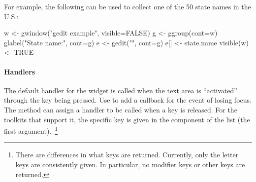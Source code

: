 For example, the following can be used to collect one of the 50 state
names in the U.S.:
\begin{Schunk}
\begin{Sinput}
 w <- gwindow("gedit example", visible=FALSE) 
 g <- ggroup(cont=w)
 glabel("State name:", cont=g)
 e <- gedit("", cont=g)
 e[] <- state.name
 visible(w) <- TRUE
\end{Sinput}
\end{Schunk}

\paragraph{Handlers}
The default handler for the  widget is called when
the text area is ``activated'' through the  key being
pressed. Use  to add a callback for the event of
losing focus. The  method can
assign a handler to be called when a key is released. For the toolkits
that support it, the specific key is given in the  component
of the list  (the first argument).~\footnote{There are
  differences in what keys are returned. Currently, only the letter
  keys are consistently given. In particular, no modifier keys or
  other keys are returned.}

